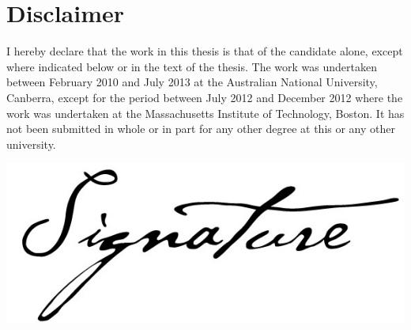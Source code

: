 \section*{Disclaimer}

I hereby declare that the work in this thesis is that of the candidate
alone, except where indicated below or in the text of the thesis. The work was undertaken between February 2010 and July 2013 at the Australian National University, Canberra, except for the period between July 2012 and December 2012 where the work was undertaken at the Massachusetts Institute of Technology, Boston. It has not been submitted in whole or in part for any other degree at this or any other university. 



\vspace{1cm}
\begin{flushright}
\includegraphics[width=0.4\linewidth]{signature.png}\\[2mm]
\fullname

\fullthesisdate
\end{flushright}

